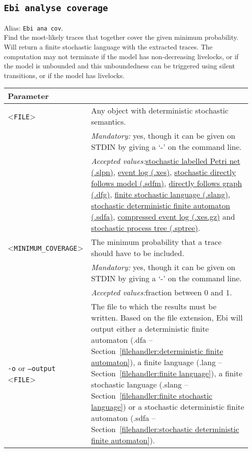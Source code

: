 {\subsection{\texttt{Ebi analyse coverage}}
\label{command:Ebi analyse coverage}
Alias: \texttt{Ebi ana cov}.\\
Find the most-likely traces that together cover the given minimum probability.
Will return a finite stochastic language with the extracted traces.
The computation may not terminate if the model has non-decreasing livelocks, or if the model is unbounded and this unboundedness can be triggered using silent transitions, or if the model has livelocks.\\
\begin{tabularx}{\linewidth}{lX}
\toprule
Parameter \\\midrule
<\texttt{FILE}>&Any object with deterministic stochastic semantics.\\
&\textit{Mandatory:} \quad yes, though it can be given on STDIN by giving a `-' on the command line.\\
&\textit{Accepted values:}\quad \hyperref[filehandler:stochastic labelled Petri net]{stochastic labelled Petri net (.slpn)}, \hyperref[filehandler:event log]{event log (.xes)}, \hyperref[filehandler:stochastic directly follows model]{stochastic directly follows model (.sdfm)}, \hyperref[filehandler:directly follows graph]{directly follows graph (.dfg)}, \hyperref[filehandler:finite stochastic language]{finite stochastic language (.slang)}, \hyperref[filehandler:stochastic deterministic finite automaton]{stochastic deterministic finite automaton (.sdfa)}, \hyperref[filehandler:compressed event log]{compressed event log (.xes.gz)} and \hyperref[filehandler:stochastic process tree]{stochastic process tree (.sptree)}.\\
<\texttt{MINIMUM\_COVERAGE}>&The minimum probability that a trace should have to be included.\\
&\textit{Mandatory:} \quad yes, though it can be given on STDIN by giving a `-' on the command line.\\
&\textit{Accepted values:}\quad fraction between 0 and 1.\\
\texttt{-o} or \texttt{--output} <\texttt{FILE}> &
The file to which the results must be written. Based on the file extension, Ebi will output either a deterministic finite automaton (.dfa -- Section~\ref{filehandler:deterministic finite automaton}), a finite language (.lang -- Section~\ref{filehandler:finite language}), a finite stochastic language (.slang -- Section~\ref{filehandler:finite stochastic language}) or a stochastic deterministic finite automaton (.sdfa -- Section~\ref{filehandler:stochastic deterministic finite automaton}).

\end{tabularx}}
